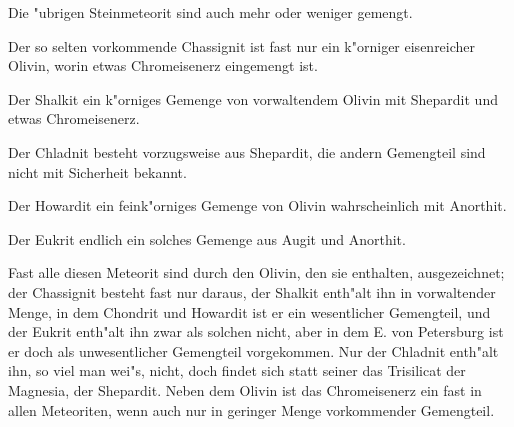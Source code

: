 \documentclass[a4paper, 11pt, oneside]{article}
\begin{document}
Die "ubrigen Steinmeteorit sind auch mehr oder weniger gemengt.

Der so selten vorkommende Chassignit ist fast nur ein k"orniger eisenreicher Olivin, worin etwas Chromeisenerz eingemengt ist.

Der Shalkit ein k"orniges Gemenge von vorwaltendem Olivin mit Shepardit und etwas Chromeisenerz.

Der Chladnit besteht vorzugsweise aus Shepardit, die andern Gemengteil sind nicht mit Sicherheit bekannt.

Der Howardit ein feink"orniges Gemenge von Olivin wahrscheinlich mit Anorthit.

Der Eukrit endlich ein solches Gemenge aus Augit und Anorthit.

Fast alle diesen Meteorit sind durch den Olivin, den sie enthalten, ausgezeichnet; der Chassignit besteht fast nur daraus, der Shalkit enth"alt ihn in vorwaltender Menge, in dem Chondrit und Howardit ist er ein wesentlicher Gemengteil, und der Eukrit enth"alt ihn zwar als solchen nicht, aber in dem E. von Petersburg ist er doch als unwesentlicher Gemengteil vorgekommen. Nur der Chladnit enth"alt ihn, so viel man wei"s, nicht, doch findet sich statt seiner das Trisilicat der Magnesia, der Shepardit. Neben dem Olivin ist das Chromeisenerz ein fast in allen Meteoriten, wenn auch nur in geringer Menge vorkommender Gemengteil.
\end{document}
